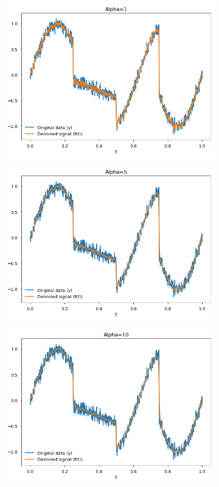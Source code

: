 \documentclass[ngerman, a4paper,12pt]{article}
\begin{document}
\begin{figure}[h]
	\centering
	\label{fig:s22}
	\begin{subfigure}[b]{0.45\textwidth}
		\includegraphics[width=1\columnwidth]{Images/2a1.png}
		\label{2a1}
	\end{subfigure}
	\begin{subfigure}[b]{0.45\textwidth}
		\includegraphics[width=1\columnwidth]{Images/2a5.png}
		\label{2a5}
	\end{subfigure}
	\begin{subfigure}[b]{0.45\textwidth}
		\includegraphics[width=1\columnwidth]{Images/2a10.png}

\end{subfigure}
\end{figure}
\end{document}
